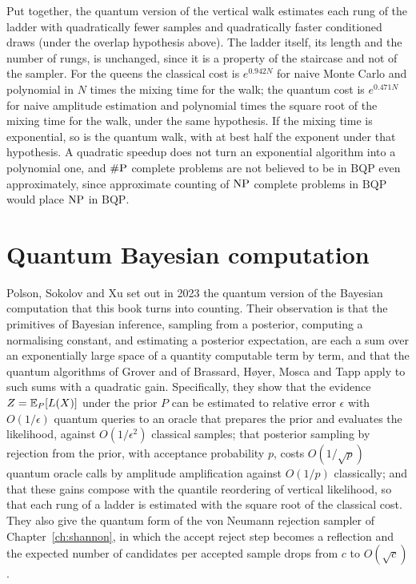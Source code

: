 Put together, the quantum version of the vertical walk estimates each rung of the ladder with quadratically fewer samples and quadratically faster conditioned draws (under the overlap hypothesis above). The ladder itself, its length and the number of rungs, is unchanged, since it is a property of the staircase and not of the sampler. For the queens the classical cost is $e^{0.942 N}$ for naive Monte Carlo and polynomial in $N$ times the mixing time for the walk; the quantum cost is $e^{0.471 N}$ for naive amplitude estimation and polynomial times the square root of the mixing time for the walk, under the same hypothesis. If the mixing time is exponential, so is the quantum walk, with at best half the exponent under that hypothesis. A quadratic speedup does not turn an exponential algorithm into a polynomial one, and $\#\mathrm{P}$ complete problems are not believed to be in $\mathrm{BQP}$ even approximately, since approximate counting of $\mathrm{NP}$ complete problems in $\mathrm{BQP}$ would place $\mathrm{NP}$ in $\mathrm{BQP}$.

\section{Quantum Bayesian computation}

Polson, Sokolov and Xu set out in 2023 the quantum version of the Bayesian computation that this book turns into counting. Their observation is that the primitives of Bayesian inference, sampling from a posterior, computing a normalising constant, and estimating a posterior expectation, are each a sum over an exponentially large space of a quantity computable term by term, and that the quantum algorithms of Grover and of Brassard, H{\o}yer, Mosca and Tapp apply to such sums with a quadratic gain. Specifically, they show that the evidence $Z = \mathbb{E}_P[L(X)]$ under the prior $P$ can be estimated to relative error $\epsilon$ with $O(1/\epsilon)$ quantum queries to an oracle that prepares the prior and evaluates the likelihood, against $O(1/\epsilon^2)$ classical samples; that posterior sampling by rejection from the prior, with acceptance probability $p$, costs $O(1/\sqrt p)$ quantum oracle calls by amplitude amplification against $O(1/p)$ classically; and that these gains compose with the quantile reordering of vertical likelihood, so that each rung of a ladder is estimated with the square root of the classical cost. They also give the quantum form of the von Neumann rejection sampler of Chapter~\ref{ch:shannon}, in which the accept reject step becomes a reflection and the expected number of candidates per accepted sample drops from $c$ to $O(\sqrt c)$.

